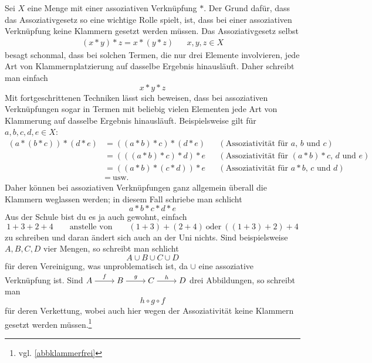 \begin{bem} \label{klammerfrei}
    Sei $X$ eine Menge mit einer assoziativen Verknüpfung $*$. Der Grund dafür, dass das Assoziativgesetz so eine wichtige Rolle spielt, ist, dass bei einer assoziativen Verknüpfung keine Klammern gesetzt werden müssen. Das Assoziativgesetz selbst
    \begin{align*}
        (x*y)*z = x*(y*z) && x,y,z\in X
    \end{align*}
    besagt schonmal, dass bei solchen Termen, die nur drei Elemente involvieren, jede Art von Klammernplatzierung auf dasselbe Ergebnis hinausläuft. Daher schreibt man einfach
        \[ x*y*z \]
    Mit fortgeschrittenen Techniken lässt sich beweisen, dass bei assoziativen Verknüpfungen sogar in Termen mit beliebig vielen Elementen jede Art von Klammerung auf dasselbe Ergebnis hinausläuft. Beispielsweise gilt für $a,b,c,d,e\in X$:
    \begin{align*}
        (a*(b*c))*(d*e) & =((a*b)*c)*(d*e) && (\text{Assoziativität für $a$, $b$ und $c$})\\
        & = (((a*b)*c)*d)*e && (\text{Assoziativität für $(a*b)*c$, $d$ und $e$})  \\
        & = ((a*b)*(c*d))*e && (\text{Assoziativität für $a*b$, $c$ und $d$})\\
        &=\ \text{usw.}
    \end{align*}
    Daher können bei assoziativen Verknüpfungen ganz allgemein überall die Klammern weglassen werden; in diesem Fall schriebe man schlicht
        \[ a*b*c*d*e \]
    Aus der Schule bist du es ja auch gewohnt, einfach
        \[ 1+3+2+4 \qquad\text{anstelle von}\qquad (1+3)+(2+4)\ \text{oder}\ ((1+3)+2)+4 \]
    zu schreiben und daran ändert sich auch an der Uni nichts. Sind beispielsweise $A,B,C,D$ vier Mengen, so schreibt man schlicht
        \[ A\cup B\cup C \cup D \]
    für deren Vereinigung, was unproblematisch ist, da $\cup$ eine assoziative Verknüpfung ist. Sind $\begin{tikzcd}[cramped] A\ar[r, "f"] & B\ar[r, "g"] & C \ar[r, "h"] & D \end{tikzcd}$ drei Abbildungen, so schreibt man
        \[ h\circ g\circ f \]
    für deren Verkettung, wobei auch hier wegen der Assoziativität keine Klammern gesetzt werden müssen.\footnote{vgl. \cref{abbklammerfrei}}
\end{bem}




